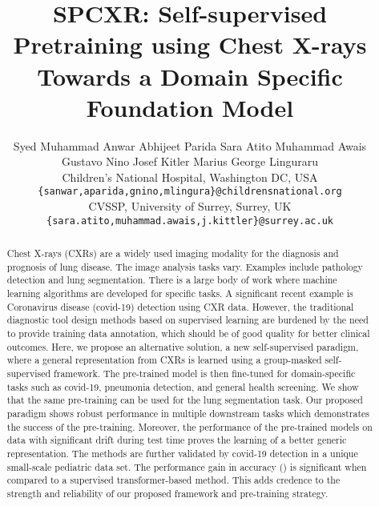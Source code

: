 \documentclass[10pt,journal,compsoc]{IEEEtran}
\begin{document}
\title{SPCXR: Self-supervised Pretraining using Chest X-rays Towards a Domain Specific Foundation Model}

\author{Syed Muhammad Anwar \vspace{0.1cm}
\qquad
Abhijeet Parida
\qquad
Sara Atito
\qquad
Muhammad Awais \\
\qquad
Gustavo Nino
\qquad
Josef Kitler
\qquad
Marius George Linguraru \vspace{0.1cm} \\
\qquad
Children's National Hospital, Washington DC, USA\\
 {\tt\small \{sanwar,aparida,gnino,mlingura\}@childrensnational.org}\\
 CVSSP, University of Surrey, Surrey, UK\\
 {\tt\small \{sara.atito,muhammad.awais,j.kittler\}@surrey.ac.uk}}
\maketitle

\begin{abstract}
   Chest X-rays (CXRs) are a widely used imaging modality for the diagnosis and prognosis of lung disease. The image analysis tasks vary. Examples include pathology detection and lung segmentation. There is a large body of work where machine learning algorithms are developed for specific tasks. A significant recent example is Coronavirus disease (covid-19) detection using CXR data. However, the traditional diagnostic tool design methods based on supervised learning are burdened by the need to provide training data annotation, which should be of good quality for better clinical outcomes. Here, we propose an alternative solution, a new self-supervised paradigm, where a general representation from CXRs is learned using a group-masked self-supervised framework. The pre-trained model is then fine-tuned for domain-specific tasks such as covid-19, pneumonia detection, and general health screening. We show that the same pre-training can be used for the lung segmentation task. Our proposed paradigm shows robust performance in multiple downstream tasks which demonstrates the success of the pre-training. Moreover, the performance of the pre-trained models on data with significant drift during test time proves the learning of a better generic representation. The methods are further validated by covid-19 detection in a unique small-scale pediatric data set. The performance gain in accuracy () is significant when compared to a supervised transformer-based method. This adds credence to the strength and reliability of our proposed framework and pre-training strategy.
\end{abstract}
\end{document}
